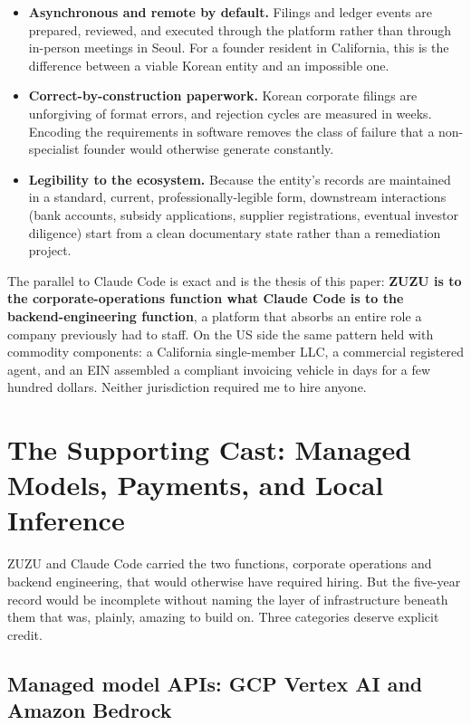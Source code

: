 \documentclass{article}
\begin{document}
\begin{itemize}
    \item \textbf{Asynchronous and remote by default.} Filings and ledger events are prepared, reviewed, and executed through the platform rather than through in-person meetings in Seoul. For a founder resident in California, this is the difference between a viable Korean entity and an impossible one.
    \item \textbf{Correct-by-construction paperwork.} Korean corporate filings are unforgiving of format errors, and rejection cycles are measured in weeks. Encoding the requirements in software removes the class of failure that a non-specialist founder would otherwise generate constantly.
    \item \textbf{Legibility to the ecosystem.} Because the entity's records are maintained in a standard, current, professionally-legible form, downstream interactions (bank accounts, subsidy applications, supplier registrations, eventual investor diligence) start from a clean documentary state rather than a remediation project.
\end{itemize}

The parallel to Claude Code is exact and is the thesis of this paper: \textbf{ZUZU is to the corporate-operations function what Claude Code is to the backend-engineering function}, a platform that absorbs an entire role a company previously had to staff. On the US side the same pattern held with commodity components: a California single-member LLC, a commercial registered agent, and an EIN assembled a compliant invoicing vehicle in days for a few hundred dollars. Neither jurisdiction required me to hire anyone.

\section{The Supporting Cast: Managed Models, Payments, and Local Inference}

ZUZU and Claude Code carried the two functions, corporate operations and backend engineering, that would otherwise have required hiring. But the five-year record would be incomplete without naming the layer of infrastructure beneath them that was, plainly, amazing to build on. Three categories deserve explicit credit.

\subsection{Managed model APIs: GCP Vertex AI and Amazon Bedrock}
\end{document}
